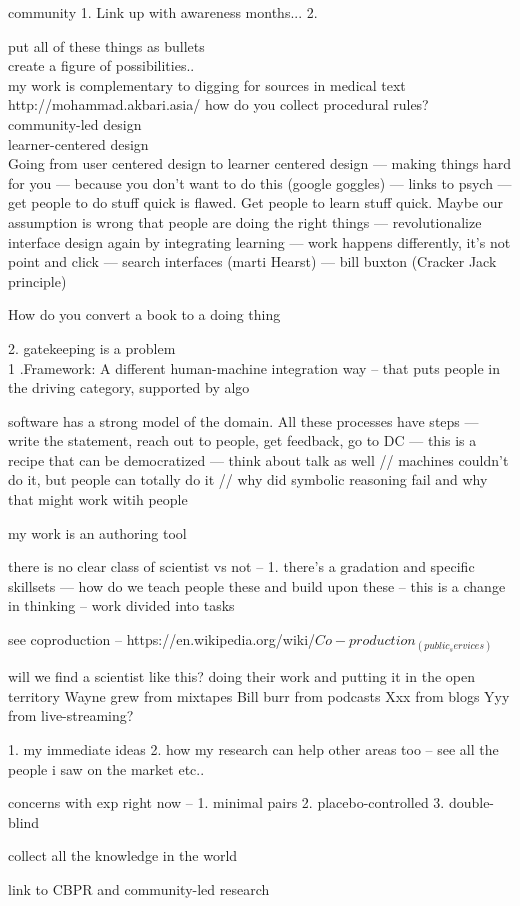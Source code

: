 community
1. Link up with awareness months...
2. 
	
put all of these things as bullets \\
create a figure of possibilities..  \\
	my work is complementary to digging for sources in medical text
    http://mohammad.akbari.asia/
how do you collect procedural rules? \\ 

community-led design \\
learner-centered design \\
Going from user centered design to learner centered design — making things hard for you — because you don’t want to do this (google goggles)  — links to psych
    — get people to do stuff quick is flawed. Get people to learn stuff quick. Maybe our assumption is wrong that people are doing the right things 
— revolutionalize interface design again by integrating learning — work happens differently, it’s not point and click — search interfaces (marti Hearst) — bill buxton (Cracker Jack principle) 

How do you convert a book to a doing thing 

2. gatekeeping is a problem \\

1 .Framework: A different human-machine integration way 
--  that puts people in the driving category, supported by algo

software has a strong model of the domain. All these processes have steps — write the statement, reach out to people, get feedback, go to DC — this is a recipe that can be democratized — think about talk as well // machines couldn't do it, but people can totally do it // why did symbolic reasoning fail and why that might work witih people

my work is an authoring tool

there is no clear class of scientist vs not -- 
1. there’s a gradation and specific skillsets — how do we teach people these and build upon these
-- this is a change in thinking -- work divided into tasks

see coproduction -- https://en.wikipedia.org/wiki/$Co-production_(public_services)$


will we find a scientist like this? doing their work and putting it in the open territory
Wayne grew from mixtapes 
Bill burr from podcasts
Xxx from blogs
Yyy from live-streaming? 

1. my immediate ideas 
2. how my research can help other areas too -- see all the people i saw on the market etc..

concerns with exp right now -- 1. minimal pairs 
2. placebo-controlled
3. double-blind

collect all the knowledge in the world

link to CBPR and community-led research
